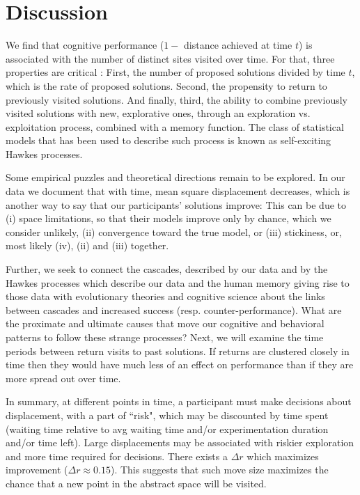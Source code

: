 \section{Discussion}
We find that cognitive performance ($1-$ distance achieved at time $t$) is associated with the number of distinct sites visited over time. For that, three properties are critical : First, the number of proposed solutions divided by time $t$, which is the rate of proposed solutions.  Second, the propensity to return to previously visited solutions. And finally, third, the ability to combine previously visited solutions with new, explorative ones, through an exploration vs. exploitation process, combined with a memory function.  The class of statistical models that has been used to describe such process is known as self-exciting Hawkes processes. 

Some empirical puzzles and theoretical directions remain to be explored. 
In our data we document that with time, mean square displacement decreases, which is another way to say that our participants' solutions improve: This can be due to (i) space limitations, so that their models improve only by chance, which we consider unlikely, (ii) convergence toward the true model, or (iii) stickiness, or, most likely (iv), (ii) and (iii) together.
  
Further, we seek to connect the cascades, described by our data and by the Hawkes processes which describe our data and the human memory giving rise to those data with evolutionary theories and cognitive science about the links between cascades and increased success (resp. counter-performance).  What are the proximate and ultimate causes that move our cognitive and behavioral patterns to follow these strange processes? Next, we will examine the time periods between return visits to past solutions.  If returns are clustered closely in time then they would have much less of an effect on performance than if they are more spread out over time.  



In summary, at different points in time, a participant must make decisions about displacement, with a part of ``risk", which may be discounted by time spent (waiting time relative to avg waiting time and/or experimentation duration and/or time left). Large displacements may be associated with riskier exploration and more time required for decisions. There exists a $\Delta r$ which maximizes improvement ($\Delta r \approx 0.15$). This suggests that such move size maximizes the chance that a new point in the abstract space will be visited.













